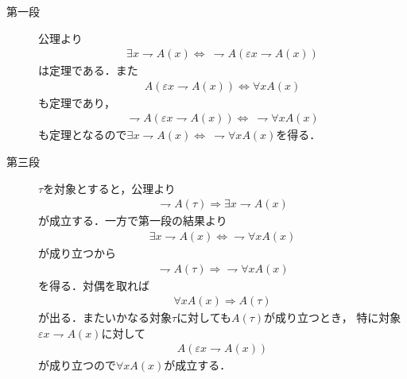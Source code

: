 	\begin{prf}\mbox{}
		\begin{description}
			\item[第一段]
				公理より
				\begin{align}
					\exists x \rightharpoondown A(x) \Longleftrightarrow\ 
					\rightharpoondown A(\varepsilon x \rightharpoondown A(x))
				\end{align}
				は定理である．また
				\begin{align}
					A(\varepsilon x \rightharpoondown A(x)) \Longleftrightarrow \forall x A(x) 
				\end{align}
				も定理であり，
				\begin{align}
					\rightharpoondown A(\varepsilon x \rightharpoondown A(x)) \Longleftrightarrow\ 
					\rightharpoondown \forall x A(x)
				\end{align}
				も定理となるので$\exists x \rightharpoondown A(x) \Longleftrightarrow\ \rightharpoondown \forall x A(x)$を得る．
			
			\item[第三段]
				$\tau$を対象とすると，公理より
				\begin{align}
					\rightharpoondown A(\tau)
					\Longrightarrow \exists x \rightharpoondown A(x)
				\end{align}
				が成立する．一方で第一段の結果より
				\begin{align}
					\exists x \rightharpoondown A(x) \Longleftrightarrow
					\rightharpoondown \forall x A(x)
				\end{align}
				が成り立つから
				\begin{align}
					\rightharpoondown A(\tau) \Longrightarrow
					\rightharpoondown \forall x A(x)
				\end{align}
				を得る．対偶を取れば
				\begin{align}
					\forall x A(x) \Longrightarrow A(\tau)
				\end{align}
				が出る．またいかなる対象$\tau$に対しても$A(\tau)$が成り立つとき，
				特に対象$\varepsilon x \rightharpoondown A(x)$に対して
				\begin{align}
					A(\varepsilon x \rightharpoondown A(x))
				\end{align}
				が成り立つので$\forall x A(x)$が成立する．
		\end{description}
		

\end{prf}
